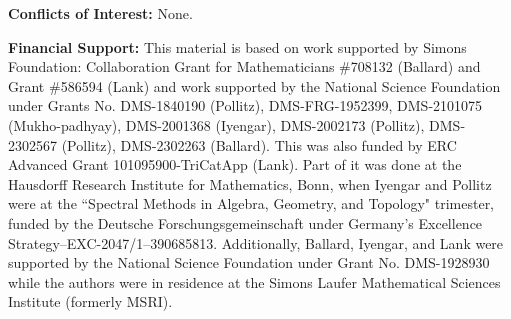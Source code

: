 \documentclass{amsart}
\theoremstyle{definition}
\theoremstyle{remark}
\numberwithin{equation}{subsection}
\begin{document}
\noindent \textbf{Conflicts of Interest:} None.

\noindent \textbf{Financial Support:} This material is based on work supported by Simons Foundation: Collaboration Grant for Mathematicians \#708132 (Ballard) and Grant \#586594 (Lank) and work supported by the National Science Foundation under Grants No. DMS-1840190 (Pollitz), DMS-FRG-1952399, DMS-2101075 (Mukho-padhyay), DMS-2001368 (Iyengar), DMS-2002173 (Pollitz), DMS-2302567 (Pollitz), DMS-2302263 (Ballard). This was also funded by ERC Advanced Grant 101095900-TriCatApp (Lank). Part of it was done at the Hausdorff Research Institute for Mathematics, Bonn, when Iyengar and Pollitz were at the ``Spectral Methods in Algebra, Geometry, and Topology" trimester, funded by the Deutsche Forschungsgemeinschaft under Germany's Excellence Strategy--EXC-2047/1--390685813. Additionally, Ballard, Iyengar, and Lank were supported by the National Science Foundation under Grant No. DMS-1928930 while the authors
were in residence at the Simons Laufer Mathematical Sciences Institute (formerly MSRI).



\end{document}

